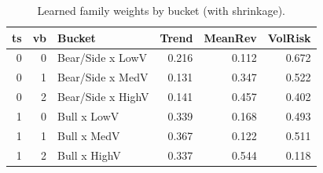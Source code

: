 \begin{table}[t]
\centering
\caption{Learned family weights by bucket (with shrinkage).}
\label{tab:family_weights_bucket}
\begin{tabular}{rrlrrr}
\toprule
ts & vb & Bucket & Trend & MeanRev & VolRisk \\
\midrule
0 & 0 & Bear/Side x LowV & 0.216 & 0.112 & 0.672 \\
0 & 1 & Bear/Side x MedV & 0.131 & 0.347 & 0.522 \\
0 & 2 & Bear/Side x HighV & 0.141 & 0.457 & 0.402 \\
1 & 0 & Bull x LowV & 0.339 & 0.168 & 0.493 \\
1 & 1 & Bull x MedV & 0.367 & 0.122 & 0.511 \\
1 & 2 & Bull x HighV & 0.337 & 0.544 & 0.118 \\
\bottomrule
\end{tabular}

\end{table}
